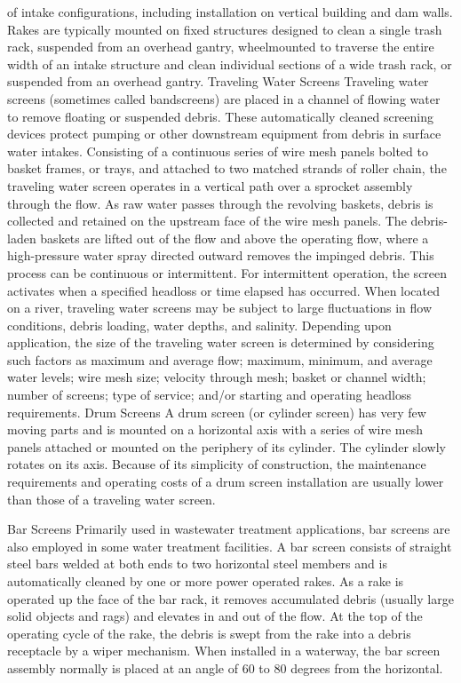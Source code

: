 \documentclass{article}
\begin{document}
of intake configurations, including installation on vertical building
and dam walls. Rakes are typically mounted on fixed structures designed
to clean a single trash rack, suspended from an overhead gantry,
wheelmounted to traverse the entire width of an intake structure and
clean individual sections of a wide trash rack, or suspended from an
overhead gantry. Traveling Water Screens Traveling water screens
(sometimes called bandscreens) are placed in a channel of flowing water
to remove floating or suspended debris. These automatically cleaned
screening devices protect pumping or other downstream equipment from
debris in surface water intakes. Consisting of a continuous series of
wire mesh panels bolted to basket frames, or trays, and attached to two
matched strands of roller chain, the traveling water screen operates in
a vertical path over a sprocket assembly through the flow. As raw water
passes through the revolving baskets, debris is collected and retained
on the upstream face of the wire mesh panels. The debris-laden baskets
are lifted out of the flow and above the operating flow, where a
high-pressure water spray directed outward removes the impinged debris.
This process can be continuous or intermittent. For intermittent
operation, the screen activates when a specified headloss or time
elapsed has occurred. When located on a river, traveling water screens
may be subject to large fluctuations in flow conditions, debris loading,
water depths, and salinity. Depending upon application, the size of the
traveling water screen is determined by considering such factors as
maximum and average flow; maximum, minimum, and average water levels;
wire mesh size; velocity through mesh; basket or channel width; number
of screens; type of service; and/or starting and operating headloss
requirements. Drum Screens A drum screen (or cylinder screen) has very
few moving parts and is mounted on a horizontal axis with a series of
wire mesh panels attached or mounted on the periphery of its cylinder.
The cylinder slowly rotates on its axis. Because of its simplicity of
construction, the maintenance requirements and operating costs of a drum
screen installation are usually lower than those of a traveling water
screen.

Bar Screens Primarily used in wastewater treatment applications, bar
screens are also employed in some water treatment facilities. A bar
screen consists of straight steel bars welded at both ends to two
horizontal steel members and is automatically cleaned by one or more
power operated rakes. As a rake is operated up the face of the bar rack,
it removes accumulated debris (usually large solid objects and rags) and
elevates in and out of the flow. At the top of the operating cycle of
the rake, the debris is swept from the rake into a debris receptacle by
a wiper mechanism. When installed in a waterway, the bar screen assembly
normally is placed at an angle of 60 to 80 degrees from the horizontal.
\end{document}
